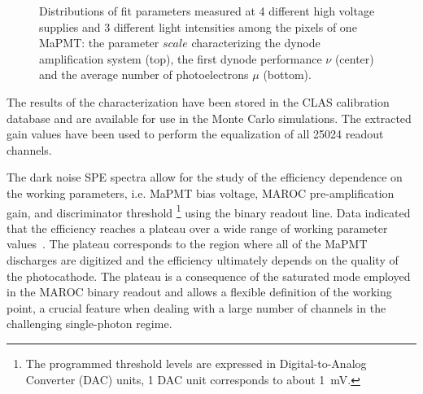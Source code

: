 \documentclass[5p,times,twocolumn]{elsarticle}
\begin{document}
\begin{figure}[h]
\begin{center}
	\caption{Distributions of fit parameters measured at 4 different high
          voltage supplies  and 3 different  light intensities among the pixels of one MaPMT: the parameter $scale$ characterizing
          the dynode amplification system (top), the first dynode performance $\nu$ (center) and the average number of photoelectrons $\mu$ (bottom).}
	\label{fig:PavelPassport}
\end{center}
\end{figure}

The results of the characterization have been stored in the CLAS calibration database and are available for use in
the Monte Carlo simulations. The extracted gain values have been used to perform the equalization of all 25024
readout channels.


The dark noise SPE spectra allow for the study of the efficiency dependence on the working parameters, i.e. MaPMT
bias voltage, MAROC pre-amplification gain, and discriminator threshold \footnote{The programmed threshold
levels are expressed in Digital-to-Analog Converter (DAC) units, 1 DAC unit corresponds to about 1~mV.} using the
binary readout line. Data indicated that the efficiency reaches a plateau over a wide range of working parameter
values~\cite{Ref:RICHElectro}. %
The plateau corresponds to the region where all of the MaPMT discharges  are digitized and the efficiency ultimately
depends on the quality of the photocathode. The plateau is a consequence of the saturated mode employed in the
MAROC binary readout and allows a flexible definition of the working point, a crucial feature when dealing with a large
number of channels in the challenging single-photon regime.

\clearpage

\end{document}
